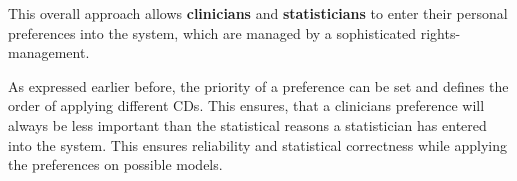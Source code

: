 This overall approach allows \textbf{clinicians} and \textbf{statisticians} to enter their personal preferences into the system, which are managed by a sophisticated rights-management. 

As expressed earlier before, the priority of a preference can be set and defines the order of applying different \glspl{CD}. This ensures, that a clinicians preference will always be less important than the statistical reasons a statistician has entered into the system. This ensures reliability and statistical correctness while applying the preferences on possible models.

